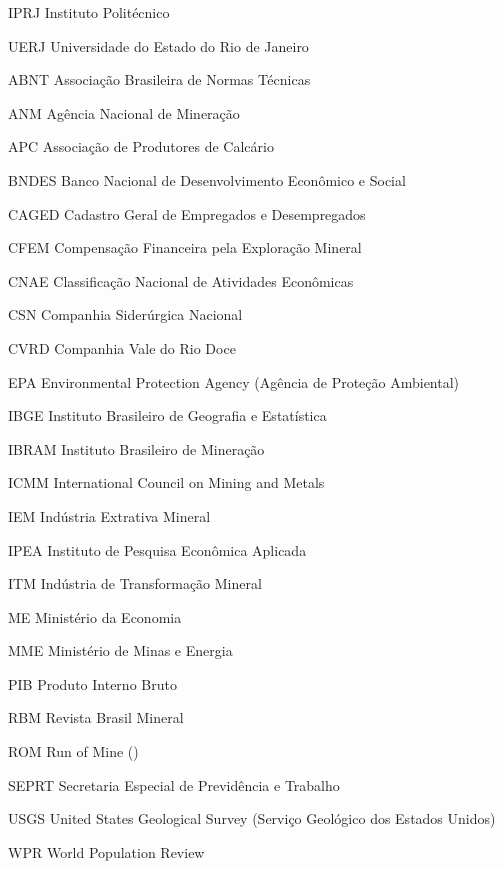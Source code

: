 \begin{siglas}
\item[IPRJ] Instituto Politécnico
\item[UERJ] Universidade do Estado do Rio de Janeiro

\item[ABNT] Associação Brasileira de Normas Técnicas
\item[ANM] Agência Nacional de Mineração
\item[APC] Associação de Produtores de Calcário
\item[BNDES] Banco Nacional de Desenvolvimento Econômico e Social
\item[CAGED] Cadastro Geral de Empregados e Desempregados
\item[CFEM] Compensação Financeira pela Exploração Mineral
\item[CNAE] Classificação Nacional de Atividades Econômicas
\item[CSN] Companhia Siderúrgica Nacional
\item[CVRD] Companhia Vale do Rio Doce
\item[EPA] Environmental Protection Agency (Agência de Proteção Ambiental)
\item[IBGE] Instituto Brasileiro de Geografia e Estatística
\item[IBRAM] Instituto Brasileiro de Mineração
\item[ICMM] International Council on Mining and Metals
\item[IEM] Indústria Extrativa Mineral
\item[IPEA] Instituto de Pesquisa Econômica Aplicada
\item[ITM] Indústria de Transformação Mineral
\item[ME] Ministério da Economia
\item[MME] Ministério de Minas e Energia
\item[PIB] Produto Interno Bruto
\item[RBM] Revista Brasil Mineral
\item[ROM] Run of Mine ()
\item[SEPRT] Secretaria Especial de Previdência e Trabalho
\item[USGS] United States Geological Survey (Serviço Geológico dos Estados Unidos)
\item[WPR] World Population Review
\end{siglas}